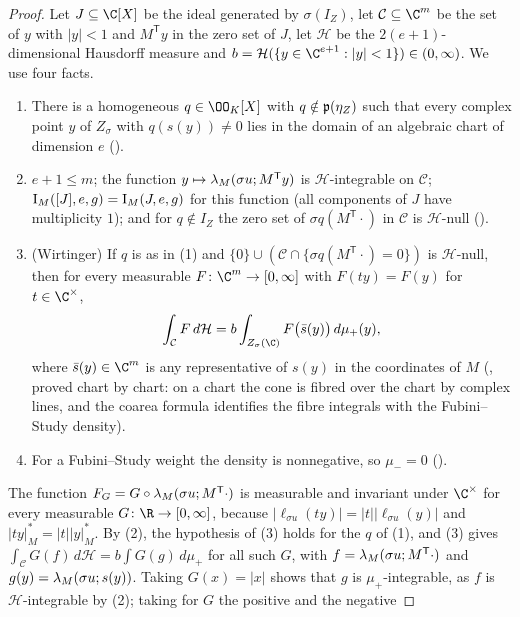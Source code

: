 \begin{proof}
Let $J\subseteq\C[X]$ be the ideal generated by $\sigma(I_Z)$, let $\mathcal C\subseteq\C^m$ be the set of
$y$ with $|y|<1$ and $M^{\mathsf T}y$ in the zero set of $J$, let $\mathcal H$ be the
$2(e+1)$-dimensional Hausdorff measure and $b=\mathcal H(\{y\in\C^{e+1}:|y|<1\})\in(0,\infty)$. We use four
facts.
\begin{enumerate}[label=(\arabic*)]
\item There is a homogeneous $q\in\OO_K[X]$ with $q\notin\mathfrak{p}(\eta_Z)$ such that every complex point
  $y$ of $Z_\sigma$ with $q(s(y))\ne0$ lies in the domain of an algebraic chart of dimension $e$
  ().
\item $e+1\le m$; the function $y\mapsto\lambda_M(\sigma u;M^{\mathsf T}y)$ is $\mathcal H$-integrable on
  $\mathcal C$; $\operatorname{I}_M([J],e,g)=\operatorname{I}_M(J,e,g)$ for this function (all components of $J$ have
  multiplicity $1$); and for $q\notin I_Z$ the zero set of $\sigma q(M^{\mathsf T}\cdot)$ in $\mathcal C$ is
  $\mathcal H$-null ().
\item (Wirtinger) If $q$ is as in (1) and $\{0\}\cup(\mathcal C\cap\{\sigma q(M^{\mathsf T}\cdot)=0\})$ is
  $\mathcal H$-null, then for every measurable $F\colon\C^m\to[0,\infty]$ with $F(ty)=F(y)$ for
  $t\in\C^\times$,
  \[
  \int_{\mathcal C}F\,d\mathcal H=b\int_{Z_\sigma(\C)}F\bigl(\bar s(y)\bigr)\,d\mu_+(y),
  \]
  where $\bar s(y)\in\C^m$ is any representative of $s(y)$ in the coordinates of $M$
  (, proved chart by chart: on a chart the cone
  is fibred over the chart by complex lines, and the coarea formula identifies the fibre integrals with
  the Fubini--Study density).
\item For a Fubini--Study weight the density is nonnegative, so $\mu_-=0$
  ().
\end{enumerate}
The function $F_G=G\circ\lambda_M(\sigma u;M^{\mathsf T}\cdot)$ is measurable and invariant under $\C^\times$
for every measurable $G\colon\R\to[0,\infty]$, because $|\ell_{\sigma u}(ty)|=|t||\ell_{\sigma u}(y)|$ and
$|ty|^*_M=|t||y|^*_M$. By (2), the hypothesis of (3) holds for the $q$ of (1), and (3) gives
$\int_{\mathcal C}G(f)\,d\mathcal H=b\int G(g)\,d\mu_+$ for all such $G$, with $f=\lambda_M(\sigma
u;M^{\mathsf T}\cdot)$ and $g(y)=\lambda_M(\sigma u;s(y))$. Taking $G(x)=|x|$ shows that $g$ is
$\mu_+$-integrable, as $f$ is $\mathcal H$-integrable by (2); taking for $G$ the positive and the negative

\end{proof}

